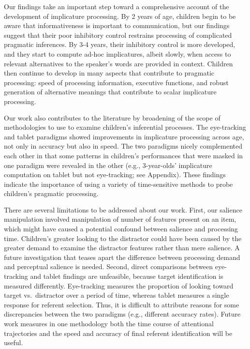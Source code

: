 \documentclass[a4paper,man,apacite,floatsintext]{apa6}
\begin{document}
Our findings take an important step toward a comprehensive account of
the development of implicature processing. By 2 years of age, children
begin to be aware that informativeness is important to communication,
but our findings suggest that their poor inhibitory control restrains
processing of complicated pragmatic inferences. By 3-4 years, their
inhibitory control is more developed, and they start to compute ad-hoc
implicatures, albeit slowly, when access to relevant alternatives to the
speaker's words are provided in context. Children then continue to
develop in many aspects that contribute to pragmatic processing: speed
of processing information, executive functions, and robust generation of
alternative meanings that contribute to scalar implicature processing.

Our work also contributes to the literature by broadening of the scope
of methodologies to use to examine children's inferential processes. The
eye-tracking and tablet paradigms showed improvements in implicature
processing across age, not only in accuracy but also in speed. The two
paradigms nicely complemented each other in that some patterns in
children's performances that were masked in one paradigm were revealed
in the other (e.g., 3-year-olds' implicature computation on tablet but
not eye-tracking; see Appendix). These findings indicate the importance
of using a variety of time-sensitive methods to probe children's
pragmatic processing.

There are several limitations to be addressed about our work. First, our
salience manipulation involved manipulation of number of features
present on an item, which might have caused a potential confound between
salience and processing time. Children's greater looking to the
distractor could have been caused by the greater demand to examine the
distractor features rather than mere salience. A future investigation
that teases apart the difference between processing demand and
perceptual salience is needed. Second, direct comparisons between
eye-tracking and tablet findings are unfeasible, because target
identification is measured differently. Eye-tracking measures the
proportion of looking toward target vs.~distractor over a period of
time, whereas tablet measures a single response for referent selection.
Thus, it is difficult to attribute reasons for some discrepancies
between the two paradigms (e.g., different accuracy rates). Future work
measures in one methodology both the time course of attentional
trajectories and the speed and accuracy of final referent identification
will be useful.
\end{document}
